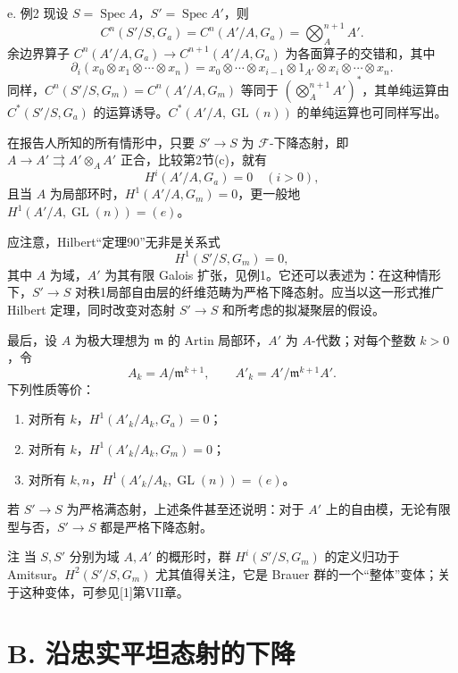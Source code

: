 \begin{statement}{e. 例2}
现设 $S=\operatorname{Spec}A$，$S'=\operatorname{Spec}A'$，则
\[
C^n(S'/S,G_a)=C^n(A'/A,G_a)=\bigotimes_A^{n+1}A'.
\]
余边界算子 $C^n(A'/A,G_a)\to C^{n+1}(A'/A,G_a)$ 为各面算子的交错和，其中
\[
\partial_i(x_0\otimes x_1\otimes\cdots\otimes x_n)
=x_0\otimes\cdots\otimes x_{i-1}\otimes1_{A'}\otimes x_i\otimes\cdots\otimes x_n.
\]
同样，$C^n(S'/S,G_m)=C^n(A'/A,G_m)$ 等同于 $(\bigotimes_A^{n+1}A')^*$，其单纯运算由 $C^*(S'/S,G_a)$ 的运算诱导。$C^*(A'/A,\operatorname{GL}(n))$ 的单纯运算也可同样写出。

在报告人所知的所有情形中，只要 $S'\to S$ 为 $\mathcal F$-下降态射，即 $A\to A'\rightrightarrows A'\otimes_AA'$ 正合，比较第2节(c)，就有
\[
H^i(A'/A,G_a)=0\quad(i>0),
\]
且当 $A$ 为局部环时，$H^1(A'/A,G_m)=0$，更一般地 $H^1(A'/A,\operatorname{GL}(n))=(e)$。

应注意，Hilbert“定理90”无非是关系式
\[
H^1(S'/S,G_m)=0,
\]
其中 $A$ 为域，$A'$ 为其有限 Galois 扩张，见例1。它还可以表述为：在这种情形下，$S'\to S$ 对秩1局部自由层的纤维范畴为严格下降态射。应当以这一形式推广 Hilbert 定理，同时改变对态射 $S'\to S$ 和所考虑的拟凝聚层的假设。

最后，设 $A$ 为极大理想为 $\mathfrak m$ 的 Artin 局部环，$A'$ 为 $A$-代数；对每个整数 $k>0$，令
\[
A_k=A/\mathfrak m^{k+1},\qquad A'_k=A'/\mathfrak m^{k+1}A'.
\]
下列性质等价：
\begin{enumerate}[label=(\roman*)]
\item 对所有 $k$，$H^1(A'_k/A_k,G_a)=0$；
\item 对所有 $k$，$H^1(A'_k/A_k,G_m)=0$；
\item 对所有 $k,n$，$H^1(A'_k/A_k,\operatorname{GL}(n))=(e)$。
\end{enumerate}
若 $S'\to S$ 为严格满态射，上述条件甚至还说明：对于 $A'$ 上的自由模，无论有限型与否，$S'\to S$ 都是严格下降态射。
\end{statement}
\begin{statement}{注}
当 $S,S'$ 分别为域 $A,A'$ 的概形时，群 $H^i(S'/S,G_m)$ 的定义归功于 Amitsur。$H^2(S'/S,G_m)$ 尤其值得关注，它是 Brauer 群的一个“整体”变体；关于这种变体，可参见[1]第VII章。
\end{statement}

\section*{B. 沿忠实平坦态射的下降}

